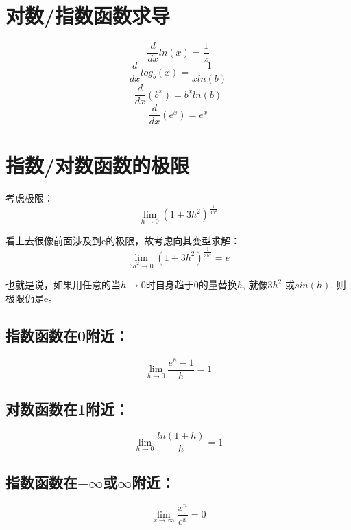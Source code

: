 \documentclass[11pt, b5paper, oneside]{book}
\begin{document}
\section{对数/指数函数求导}

\begin{equation}
    \frac{d}{dx}ln(x) = \frac{1}{x}
\end{equation}
\begin{equation}
    \frac{d}{dx}log_b(x) = \frac{1}{xln(b)}
\end{equation}
\begin{equation}
    \frac{d}{dx}(b^x) = b^xln(b)
\end{equation}
\begin{equation}
    \frac{d}{dx}(e^x) = e^x
\end{equation}

\section{指数/对数函数的极限}
考虑极限：
\[\lim\limits_{h\to 0}(1+3h^2)^{\frac{1}{3h^2}}\]

看上去很像前面涉及到e的极限，故考虑向其变型求解：
\[\lim\limits_{3h^2\to 0}(1+3h^2)^{\frac{1}{3h^2}} = e\]

也就是说，如果用任意的当$h\to 0$时自身趋于$0$的量替换$h$, 就像$3h^2$ 或$sin(h)$, 则极限仍是e。

\subsection{指数函数在0附近：}
\begin{equation}
    \lim\limits_{h\to 0}\frac{e^h-1}{h} = 1
\end{equation}

\subsection{对数函数在1附近：}
\begin{equation}
    \lim\limits_{h\to 0}\frac{ln(1+h)}{h} = 1
\end{equation}

\subsection{指数函数在$-\infty$或$\infty$附近：}

\begin{equation}
    \lim\limits_{x\to \infty}\frac{x^n}{e^x} = 0
\end{equation}
\end{document}
